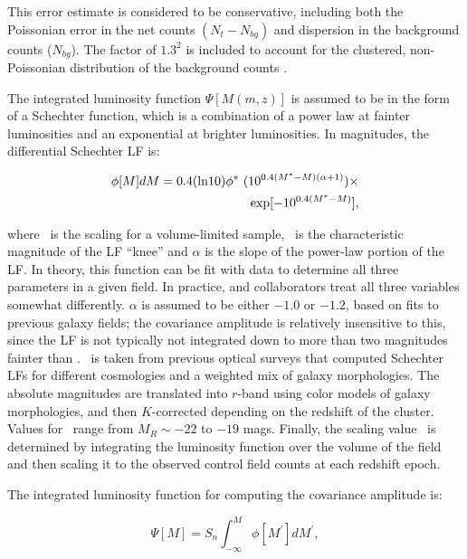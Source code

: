 \documentclass{emulateapj}
\begin{document}
\noindent This error estimate is considered to be conservative, including both the Poissonian error in the net counts $(N_t - N_{bg})$ and dispersion in the background counts ($N_{bg}$). The factor of $1.3^2$ is included to account for the clustered, non-Poissonian distribution of the background counts \citep{yee99}. 

The integrated luminosity function $\Psi[M(m,z)]$ is assumed to be in the form of a Schechter function, which is a combination of a power law at fainter luminosities and an exponential at brighter luminosities. In magnitudes, the differential Schechter LF is:

\begin{eqnarray}
\label{eqn-schechter}
\phi[M] dM = 0.4 ({\rm ln} 10) \phi^*~(10^{0.4(M^* - M)(\alpha + 1)}) \times \nonumber \\
{\rm exp}[-10^{0.4(M^*-M)}],
\end{eqnarray}

\noindent where \phistar~is the scaling for a volume-limited sample, \mstar~is the characteristic magnitude of the LF ``knee'' and $\alpha$ is the slope of the power-law portion of the LF. In theory, this function can be fit with data to determine all three parameters in a given field. In practice, \citet{yee87} and collaborators treat all three variables somewhat differently. $\alpha$ is assumed to be either $-1.0$ or $-1.2$, based on fits to previous galaxy fields; the covariance amplitude is relatively insensitive to this, since the LF is not typically not integrated down to more than two magnitudes fainter than \mstar. \mstar~is taken from previous optical surveys \citep{kin85,seb86} that computed Schechter LFs for different cosmologies and a weighted mix of galaxy morphologies. The absolute magnitudes are translated into $r$-band using color models of galaxy morphologies, and then $K$-corrected depending on the redshift of the cluster. Values for \mstar~range from $M_R\sim-22$ to $-19$ mags. Finally, the scaling value \phistar~is determined by integrating the luminosity function over the volume of the field and then scaling it to the observed control field counts at each redshift epoch. 

The integrated luminosity function for computing the covariance amplitude is:

\begin{equation}
\label{eqn-schechter_int}
\Psi[M] = S_n \int_{-\infty}^{M} \phi[M^\prime] dM^\prime, 
\end{equation}
\end{document}
